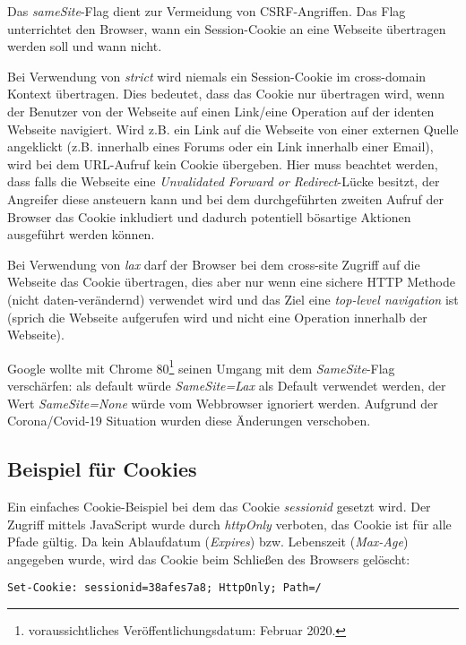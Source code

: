 Das \textit{sameSite}-Flag dient zur Vermeidung von CSRF-Angriffen. Das Flag unterrichtet den Browser, wann ein Session-Cookie an eine Webseite übertragen werden soll und wann nicht.

Bei Verwendung von \textit{strict} wird niemals ein Session-Cookie im cross-domain Kontext übertragen. Dies bedeutet, dass das Cookie nur übertragen wird, wenn der Benutzer von der Webseite auf einen Link/eine Operation auf der identen Webseite navigiert. Wird z.B. ein Link auf die Webseite von einer externen Quelle angeklickt (z.B. innerhalb eines Forums oder ein Link innerhalb einer Email), wird bei dem URL-Aufruf kein Cookie übergeben. Hier muss beachtet werden, dass falls die Webseite eine \textit{Unvalidated Forward or Redirect}-Lücke besitzt, der Angreifer diese ansteuern kann und bei dem durchgeführten zweiten Aufruf der Browser das Cookie inkludiert und dadurch potentiell bösartige Aktionen ausgeführt werden können.

Bei Verwendung von \textit{lax} darf der Browser bei dem cross-site Zugriff auf die Webseite das Cookie übertragen, dies aber nur wenn eine sichere HTTP Methode (nicht daten-verändernd) verwendet wird und das Ziel eine \textit{top-level navigation} ist (sprich die Webseite aufgerufen wird und nicht eine Operation innerhalb der Webseite).

Google wollte mit Chrome 80\footnote{voraussichtliches Veröffentlichungsdatum: Februar 2020.} seinen Umgang mit dem \textit{SameSite}-Flag verschärfen: als default würde \textit{SameSite=Lax} als Default verwendet werden, der Wert \textit{SameSite=None} würde vom Webbrowser ignoriert werden. Aufgrund der Corona/Covid-19 Situation wurden diese Änderungen verschoben.

\subsection{Beispiel für Cookies}

Ein einfaches Cookie-Beispiel bei dem das Cookie \textit{sessionid} gesetzt wird. Der Zugriff mittels JavaScript wurde durch \textit{httpOnly} verboten, das Cookie ist für alle Pfade gültig. Da kein Ablaufdatum (\textit{Expires}) bzw. Lebenszeit (\textit{Max-Age}) angegeben wurde, wird das Cookie beim Schließen des Browsers gelöscht:

\begin{verbatim}
Set-Cookie: sessionid=38afes7a8; HttpOnly; Path=/
\end{verbatim}

